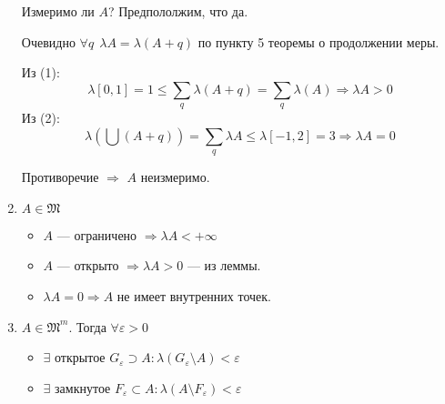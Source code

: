 \begin{enumerate}
          Измеримо ли \(A\)? Предпололжим, что да.

          Очевидно \(\forall q \ \ \lambda A = \lambda(A + q)\) по пункту 5 теоремы о продолжении меры.

          Из (1):
          \[\lambda[0, 1] = 1 \le \sum_q \lambda(A + q) = \sum_q \lambda(A) \Rightarrow \lambda A > 0\]
          Из (2):
          \[\lambda\left( \bigcup(A + q) \right) = \sum_q \lambda A \leq \lambda[ - 1, 2] = 3 \Rightarrow \lambda A = 0\]

          Противоречие \( \Rightarrow \) \(A\) неизмеримо.
    \item \(A \in \mathfrak{M}\) %

          \begin{itemize}
              \item \(A\) --- ограничено \( \Rightarrow \lambda A < +\infty\)
              \item \(A\) --- открыто \( \Rightarrow \lambda A > 0\) --- из леммы. %
              \item \(\lambda A = 0 \Rightarrow A\) не имеет внутренних точек.
          \end{itemize}

    \item \(A\in \mathfrak{M}^m\). Тогда \(\forall \varepsilon > 0\)

          \begin{itemize}
              \item \(\exists \) открытое \(G_\varepsilon\supset A : \lambda(G_\varepsilon \setminus A) < \varepsilon\)
              \item \(\exists \) замкнутое \(F_\varepsilon\subset A : \lambda(A \setminus F_\varepsilon) < \varepsilon\)
          \end{itemize}


\end{enumerate}
